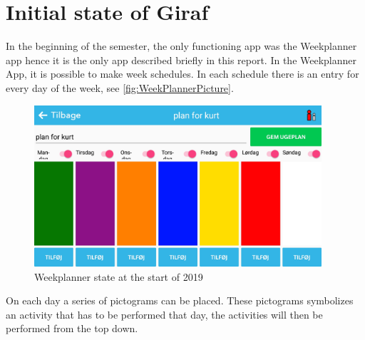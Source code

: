 \section{Initial state of Giraf}
In the beginning of the semester, the only functioning app was the Weekplanner app\cite{AppsStatus2019} hence it is the only app described briefly in this report. In the Weekplanner App, it is possible to make week schedules. In each schedule there is an entry for every day of the week, see \autoref{fig:WeekPlannerPicture}. 

\begin{figure}[h]
        \begin{center}
            \includegraphics[width=0.95\textwidth]{figures/WeekPlannerPicture}
        \end{center}
        \caption{Weekplanner state at the start of 2019}
        \label{fig:WeekPlannerPicture}
\end{figure}

On each day a series of pictograms can be placed. These pictograms symbolizes an activity that has to be performed that day, the activities will then be performed from the top down. 

